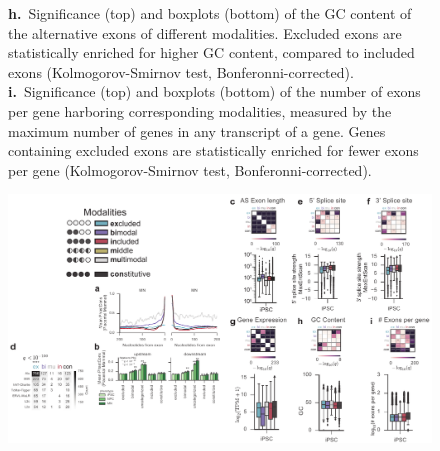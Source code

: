\begin{figure}[h]
{\textbf{h.}~Significance (top) and boxplots (bottom) of the GC content of the alternative exons of different modalities. Excluded exons are statistically enriched for higher GC content, compared to included exons (Kolmogorov-Smirnov test, Bonferonni-corrected).\\
\textbf{i.}~Significance (top) and boxplots (bottom) of the number of exons per gene harboring corresponding modalities, measured by the maximum number of genes in any transcript of a gene. Genes containing excluded exons are statistically enriched for fewer exons per gene (Kolmogorov-Smirnov test, Bonferonni-corrected).\\
}
\label{fig:modality_features_supplementary_part1}

\end{figure}
\clearpage
\begin{figure}[h]
\ContinuedFloat
\captionsetup{labelformat=empty}
\centering
\includegraphics[width=5.8in]{figures/modality_features_supplementary_part1.pdf}
\end{figure}
\clearpage


